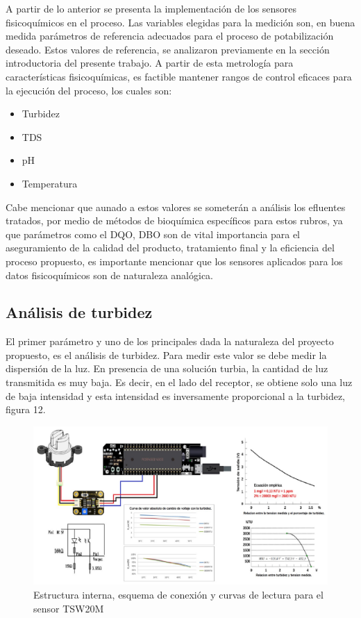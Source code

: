 \documentclass[conference]{IEEEtran}
\begin{document}
A partir de lo anterior se presenta la implementación de los sensores fisicoquímicos en el proceso. Las variables elegidas para la medición son, en buena medida parámetros de referencia adecuados para el proceso de potabilización deseado. Estos valores de referencia, se analizaron previamente en la sección introductoria del presente trabajo. A partir de esta metrología para características fisicoquímicas, es factible mantener rangos de control eficaces para la ejecución del proceso, los cuales son:


\begin{itemize}
	\item Turbidez
	\item TDS
	\item pH
	\item Temperatura
\end{itemize}

Cabe mencionar que aunado a estos valores se someterán a análisis los efluentes tratados, por medio de métodos de bioquímica específicos para estos rubros, ya que parámetros como el DQO, DBO son de vital importancia para el aseguramiento de la calidad del producto, tratamiento final y la eficiencia del proceso propuesto, es importante mencionar que los sensores aplicados para los datos fisicoquímicos son de naturaleza analógica.

\subsection{Análisis de turbidez}

El primer parámetro y uno de los principales dada la naturaleza del proyecto propuesto, es el análisis de turbidez. Para medir este valor se debe medir la dispersión de la luz. En presencia de una solución turbia, la cantidad de luz transmitida es muy baja. Es decir, en el lado del receptor, se obtiene solo una luz de baja intensidad y esta intensidad es inversamente proporcional a la turbidez, figura 12.

\begin{figure}[htbp]
	\centering
	\includegraphics[width=0.9\columnwidth]{fig12.jpg}
	\caption{Estructura interna, esquema de conexión y curvas de lectura para el sensor TSW20M}
	\label{fig:sensor-turbidez}
\end{figure}
\end{document}
